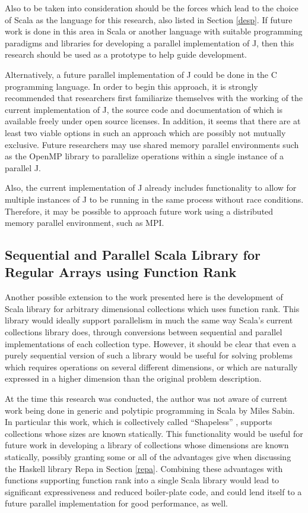 Also to be taken into consideration should be 
the forces which lead to the choice of Scala as the language 
for this research, also listed in Section \ref{desp}. 
If future work is done in this area in Scala 
or another language with suitable programming paradigms and libraries 
for developing a parallel implementation of J, 
then this research should be used as a prototype 
to help guide development.

Alternatively, a future parallel implementation of J
could be done in the C programming language. 
In order to begin this approach, 
it is strongly recommended that researchers first 
familiarize themselves with the working of the current implementation of J\cite{ioj}, 
the source code and documentation of which 
is available freely under open source licenses.
In addition, it seems that there are at least two viable options in such an approach 
which are possibly not mutually exclusive.
Future researchers may use shared memory parallel environments
such as the OpenMP library 
to parallelize operations within a single instance of a parallel J.

Also, the current implementation of J already includes 
functionality to allow for multiple instances of J to be running in the same process 
without race conditions.
Therefore, it may be possible to approach future work using 
a distributed memory parallel environment, such as MPI. %

\subsection{Sequential and Parallel Scala Library for Regular Arrays using Function Rank}
Another possible extension to the work presented here 
is the development of Scala library for arbitrary dimensional collections which uses function rank. 
This library would ideally support parallelism in much the same way 
Scala's current collections library does\cite{pc},
through conversions between sequential and parallel implementations of each collection type. 
However, it should be clear that even 
a purely sequential version of such a library would be useful 
for solving problems which requires operations on several different dimensions, 
or which are naturally expressed in a higher dimension than the original problem description.

At the time this research was conducted, 
the author was not aware of current work being done in 
generic and polytipic programming in Scala by Miles Sabin. 
In particular this work, which is collectively called ``Shapeless''%
, supports collections whose sizes are known statically. 
This functionality would be useful for future work in developing 
a library of collections whose dimensions are known statically, 
possibly granting some or all of the advantages give when discussing 
the Haskell library Repa \cite{dph} in Section \ref{repa}.
Combining these advantages with functions supporting function rank into a single Scala library
would lead to significant expressiveness and reduced boiler-plate code, 
and could lend itself to a future parallel implementation for good performance, as well.
